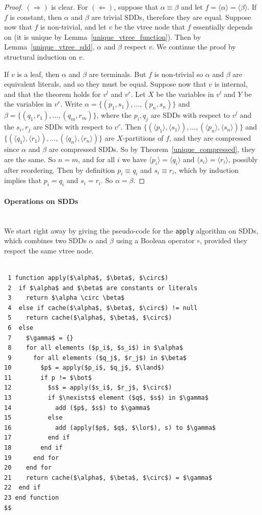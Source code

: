 \documentclass[11pt]{article}
\newcommand{\myparagraph}[1]{\paragraph{#1}\mbox{}\\}
\begin{document}
\begin{proof}
$(\Rightarrow)$ is clear. For $(\Leftarrow)$, suppose that $\alpha \equiv \beta$ and let $f = \langle \alpha \rangle = \langle \beta \rangle.$ If $f$ is constant, then $\alpha$ and $\beta$ are trivial SDDs, therefore they are equal.
Suppose  now that $f$ is non-trivial, and let $v$ be the vtree node that $f$ essentially depends on (it is unique by Lemma~\ref{unique_vtree_function}). Then by Lemma~\ref{unique_vtree_sdd}, $\alpha$ and $\beta$ respect $v$. 
We continue the proof by structural induction on $v$. 

If $v$ is a leaf, then $\alpha$ and $\beta$ are terminals. But $f$ is non-trivial so $\alpha$ and $\beta$ are equivalent literals, and so they must be equal. 
Suppose now that $v$ is internal, and that the theorem holds for $v^l$ and $v^r$. Let $X$ be the variables in $v^l$ and $Y$ be the variables in $v^r$. 
Write $\alpha = \{(p_1,s_1), ..., (p_n,s_n)\}$  and $\beta = \{(q_1,r_1), ..., (q_m,r_m)\}$, where the $p_i, q_j$ are SDDs with respect to $v^l$ and the $s_i, r_j$ are SDDs with respect to $v^r$. Then  $\{(\langle p_1 \rangle,\langle s_1\rangle), ..., (\langle p_n\rangle,\langle s_n\rangle)\}$ and  $\{(\langle q_1 \rangle,\langle r_1\rangle), ..., (\langle q_n\rangle,\langle r_n\rangle)\}$ are $X$-partitions of $f$, and they are compressed since $\alpha$ and $\beta$ are compressed SDDs. So by Theorem~\ref{unique_compressed}, they are the same. So $n = m$, and for all $i$ we have $\langle p_i\rangle = \langle q_i \rangle $ and $\langle s_i \rangle = \langle r_i\rangle$, possibly after reordering. Then by definition $p_i \equiv q_i$ and $s_i \equiv r_i$, which by induction implies that $p_i = q_i$ and $s_i = r_i$. So $\alpha = \beta$.
\end{proof}

\myparagraph{Operations on SDDs} 

We start right away by giving the pseudo-code for the \texttt{apply} algorithm on SDDs, which combines two SDDs $\alpha$ and $\beta$ using a Boolean operator $\circ$, provided they respect the same vtree node.

\label{operations}
 
\begin{lstlisting}[mathescape]

 1 function apply($\alpha$, $\beta$, $\circ$)
 2  if $\alpha$ and $\beta$ are constants or literals
 3    return $\alpha \circ \beta$   
 4  else if cache($\alpha$, $\beta$, $\circ$) != null
 5    return cache($\alpha$, $\beta$, $\circ$)
 6  else
 7    $\gamma$ = {}
 8    for all elements ($p_i$, $s_i$) in $\alpha$
 9      for all elements ($q_j$, $r_j$) in $\beta$ 
10        $p$ = apply($p_i$, $q_j$, $\land$)
11        if p != $\bot$
12          $s$ = apply($s_i$, $r_j$, $\circ$)
13          if $\nexists$ element ($q$, $s$) in $\gamma$
14            add ($p$, $s$) to $\gamma$
15          else 
16            add (apply($p$, $q$, $\lor$), s) to $\gamma$
17          end if
18        end if
19      end for
20    end for
21    return cache($\alpha$, $\beta$, $\circ$) = $\gamma$
22  end if
23 end function
$$
\end{lstlisting}
\end{document}
